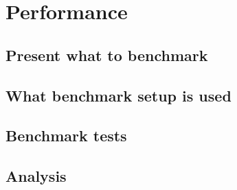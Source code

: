 
\chapter{Performance}

\section{Present what to benchmark}
\section{What benchmark setup is used}
\section{Benchmark tests}
\section{Analysis}

